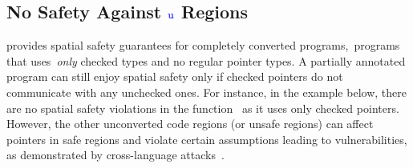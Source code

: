 
\subsection{No Safety Against $\textcolor{blue}{\texttt{u}}$ Regions}
\label{subsec:nosafetyagsintuncheckedcode}
\checkedc provides spatial safety guarantees for completely converted programs,~\ie programs that uses~\emph{only} checked types and no regular pointer types.
A partially annotated program can still enjoy spatial safety only if checked pointers do not communicate with any unchecked ones. For instance, in the example below, there are no spatial safety violations in the function~ as it uses only checked pointers.
However, the other unconverted code regions (or unsafe regions) can affect pointers in safe regions and violate certain assumptions leading to vulnerabilities, as demonstrated by cross-language attacks~\cite{mergendahlcross}.

